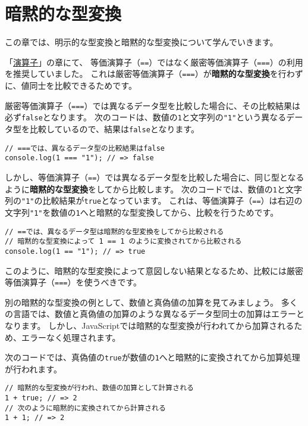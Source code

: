 \hypertarget{implicit-coercion}{%
\chapter{暗黙的な型変換}\label{implicit-coercion}}
\thispagestyle{frontheadings}

この章では、明示的な型変換と暗黙的な型変換について学んでいきます。

「\hyperlink{operator}{演算子}」の章にて、
等価演算子（\texttt{==}）ではなく厳密等価演算子（\texttt{===}）の利用を推奨していました。
これは厳密等価演算子（\texttt{===}）が\textbf{暗黙的な型変換}を行わずに、値同士を比較できるためです。

厳密等価演算子（\texttt{===}）では異なるデータ型を比較した場合に、その比較結果は必ず\texttt{false}となります。
次のコードは、数値の\texttt{1}と文字列の\texttt{"1"}という異なるデータ型を比較しているので、結果は\texttt{false}となります。

\begin{lstlisting}
// ===では、異なるデータ型の比較結果はfalse
console.log(1 === "1"); // => false
\end{lstlisting}

しかし、等価演算子（\texttt{==}）では異なるデータ型を比較した場合に、同じ型となるように\textbf{暗黙的な型変換}をしてから比較します。
次のコードでは、数値の\texttt{1}と文字列の\texttt{"1"}の比較結果が\texttt{true}となっています。
これは、等価演算子（\texttt{==}）は右辺の文字列\texttt{"1"}を数値の\texttt{1}へと暗黙的な型変換してから、比較を行うためです。

\begin{lstlisting}
// ==では、異なるデータ型は暗黙的な型変換をしてから比較される
// 暗黙的な型変換によって 1 == 1 のように変換されてから比較される
console.log(1 == "1"); // => true
\end{lstlisting}

このように、暗黙的な型変換によって意図しない結果となるため、比較には厳密等価演算子（\texttt{===}）を使うべきです。

別の暗黙的な型変換の例として、数値と真偽値の加算を見てみましょう。
多くの言語では、数値と真偽値の加算のような異なるデータ型同士の加算はエラーとなります。
しかし、JavaScriptでは暗黙的な型変換が行われてから加算されるため、エラーなく処理されます。

次のコードでは、真偽値の\texttt{true}が数値の\texttt{1}へと暗黙的に変換されてから加算処理が行われます。

\begin{lstlisting}
// 暗黙的な型変換が行われ、数値の加算として計算される
1 + true; // => 2
// 次のように暗黙的に変換されてから計算される
1 + 1; // => 2
\end{lstlisting}

